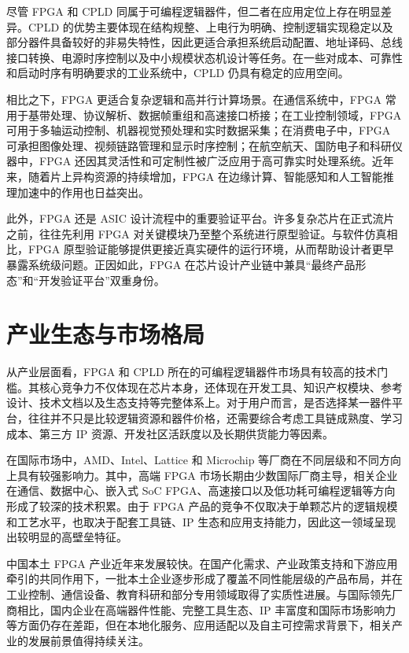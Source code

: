 尽管 FPGA 和 CPLD
同属于可编程逻辑器件，但二者在应用定位上存在明显差异。CPLD
的优势主要体现在结构规整、上电行为明确、控制逻辑实现稳定以及部分器件具备较好的非易失特性，因此更适合承担系统启动配置、地址译码、总线接口转换、电源时序控制以及中小规模状态机设计等任务。在一些对成本、可靠性和启动时序有明确要求的工业系统中，CPLD
仍具有稳定的应用空间。

相比之下，FPGA 更适合复杂逻辑和高并行计算场景。在通信系统中，FPGA
常用于基带处理、协议解析、数据帧重组和高速接口桥接；在工业控制领域，FPGA
可用于多轴运动控制、机器视觉预处理和实时数据采集；在消费电子中，FPGA
可承担图像处理、视频链路管理和显示时序控制；在航空航天、国防电子和科研仪器中，FPGA
还因其灵活性和可定制性被广泛应用于高可靠实时处理系统。近年来，随着片上异构资源的持续增加，FPGA
在边缘计算、智能感知和人工智能推理加速中的作用也日益突出。

此外，FPGA 还是 ASIC
设计流程中的重要验证平台。许多复杂芯片在正式流片之前，往往先利用 FPGA
对关键模块乃至整个系统进行原型验证。与软件仿真相比，FPGA
原型验证能够提供更接近真实硬件的运行环境，从而帮助设计者更早暴露系统级问题。正因如此，FPGA
在芯片设计产业链中兼具``最终产品形态''和``开发验证平台''双重身份。

\section{产业生态与市场格局}\label{ux4ea7ux4e1aux751fux6001ux4e0eux5e02ux573aux683cux5c40}

从产业层面看，FPGA 和 CPLD
所在的可编程逻辑器件市场具有较高的技术门槛。其核心竞争力不仅体现在芯片本身，还体现在开发工具、知识产权模块、参考设计、技术文档以及生态支持等完整体系上。对于用户而言，是否选择某一器件平台，往往并不只是比较逻辑资源和器件价格，还需要综合考虑工具链成熟度、学习成本、第三方
IP 资源、开发社区活跃度以及长期供货能力等因素。

在国际市场中，AMD、Intel、Lattice 和 Microchip
等厂商在不同层级和不同方向上具有较强影响力。其中，高端 FPGA
市场长期由少数国际厂商主导，相关企业在通信、数据中心、嵌入式 SoC
FPGA、高速接口以及低功耗可编程逻辑等方向形成了较深的技术积累。由于 FPGA
产品的竞争不仅取决于单颗芯片的逻辑规模和工艺水平，也取决于配套工具链、IP
生态和应用支持能力，因此这一领域呈现出较明显的高壁垒特征。

中国本土 FPGA
产业近年来发展较快。在国产化需求、产业政策支持和下游应用牵引的共同作用下，一批本土企业逐步形成了覆盖不同性能层级的产品布局，并在工业控制、通信设备、教育科研和部分专用领域取得了实质性进展。与国际领先厂商相比，国内企业在高端器件性能、完整工具生态、IP
丰富度和国际市场影响力等方面仍存在差距，但在本地化服务、应用适配以及自主可控需求背景下，相关产业的发展前景值得持续关注。

